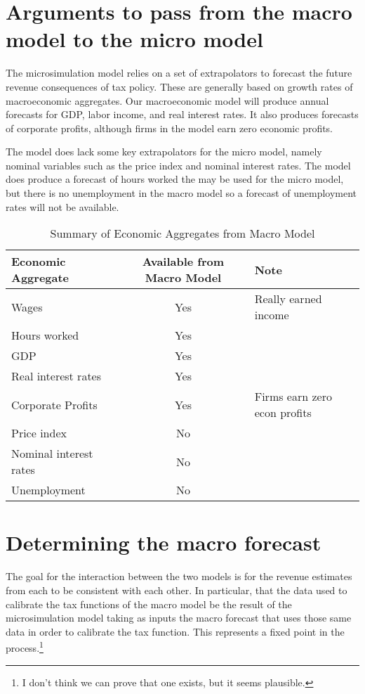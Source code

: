 \documentclass[letterpaper,11pt]{article}
\theoremstyle{definition}
\begin{document}
\section{Arguments to pass from the macro model to the micro model}

The microsimulation model relies on a set of extrapolators to forecast the future revenue consequences of tax policy.  These are generally based on growth rates of macroeconomic aggregates.  Our macroeconomic model will produce annual forecasts for GDP, labor income, and real interest rates.  It also produces forecasts of corporate profits, although firms in the model earn zero economic profits.

The model does lack some key extrapolators for the micro model, namely nominal variables such as the price index and nominal interest rates.  The model does produce a forecast of hours worked the may be used for the micro model, but there is no unemployment in the macro model so a forecast of unemployment rates will not be available.


\begin{table}[htbp]
  \centering
  \caption{Summary of Economic Aggregates from Macro Model}
    \begin{tabular}{lcl}
    \hline
    \hline
    Economic Aggregate & Available from Macro Model & Note \\
    \hline
    Wages & Yes   & Really earned income \\
    Hours worked & Yes   &  \\
    GDP   & Yes   &  \\
    Real interest rates & Yes   &  \\
    Corporate Profits & Yes   & Firms earn zero econ profits \\
    Price index & No    &  \\
    Nominal interest rates & No    &  \\
    Unemployment & No    &  \\
   \hline
   \hline
    \end{tabular}%
  \label{tab:macro_vars}%
\end{table}%


\section{Determining the macro forecast}

The goal for the interaction between the two models is for the revenue estimates from each to be consistent with each other.  In particular, that the data used to calibrate the tax functions of the macro model be the result of the microsimulation model taking as inputs the macro forecast that uses those same data in order to calibrate the tax function.  This represents a fixed point in the process.\footnote{I don't think we can prove that one exists, but it seems plausible.}
\end{document}

